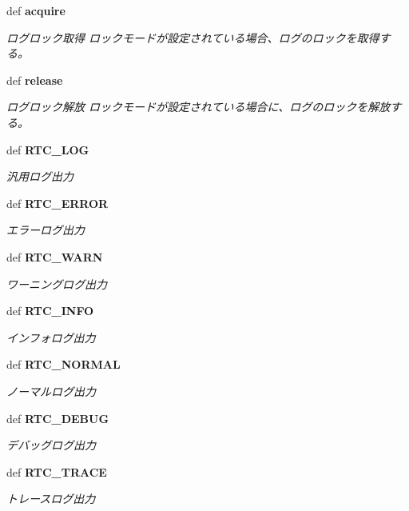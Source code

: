 \begin{CompactItemize}
def {\bf acquire}
\begin{CompactList}\small\item\em ログロック取得 ロックモードが設定されている場合、ログのロックを取得する。 \item\end{CompactList}\item 
def {\bf release}
\begin{CompactList}\small\item\em ログロック解放 ロックモードが設定されている場合に、ログのロックを解放する。 \item\end{CompactList}\item 
def {\bf RTC\_\-LOG}
\begin{CompactList}\small\item\em 汎用ログ出力 \item\end{CompactList}\item 
def {\bf RTC\_\-ERROR}
\begin{CompactList}\small\item\em エラーログ出力 \item\end{CompactList}\item 
def {\bf RTC\_\-WARN}
\begin{CompactList}\small\item\em ワーニングログ出力 \item\end{CompactList}\item 
def {\bf RTC\_\-INFO}
\begin{CompactList}\small\item\em インフォログ出力 \item\end{CompactList}\item 
def {\bf RTC\_\-NORMAL}
\begin{CompactList}\small\item\em ノーマルログ出力 \item\end{CompactList}\item 
def {\bf RTC\_\-DEBUG}
\begin{CompactList}\small\item\em デバッグログ出力 \item\end{CompactList}\item 
def {\bf RTC\_\-TRACE}
\begin{CompactList}\small\item\em トレースログ出力 \item\end{CompactList}\item 

\end{CompactItemize}
